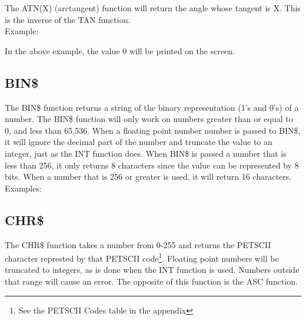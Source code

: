 The {\ttfamily ATN(X)} (arctangent) function will return the angle whose
tangent is {\ttfamily X}.  This is the inverse of the {\ttfamily TAN}
function.\\

Example:\\


In the above example, the value 0 will be printed on the screen.\\

\subsection{BIN\$}

The {\ttfamily BIN\$} function returns a string of the binary representation
(1's and 0's) of a number.  The {\ttfamily BIN\$} function will only work on
numbers greater than or equal to 0, and less than 65,536.  When a floating
point number number is passed to {\ttfamily BIN\$}, it will ignore the decimal
part of the number and truncate the value to an integer, just as the {\ttfamily
INT} function does.  When {\ttfamily BIN\$} is passed a number that is less
than 256, it only returns 8 characters since the value can be represented by 8
bits.  When a number that is 256 or greater is used, it will return 16
characters.\\

Examples:\\


\subsection{CHR\$}

The {\ttfamily CHR\$} function takes a number from 0-255 and returns the
PETSCII character represted by that PETSCII code\footnote{See the PETSCII Codes
table in the appendix}.  Floating point numbers will be truncated to integers,
as is done when the {\ttfamily INT} function is used.  Numbers outside that
range will cause an error.  The opposite of this function is the {\ttfamily
ASC} function.\\

